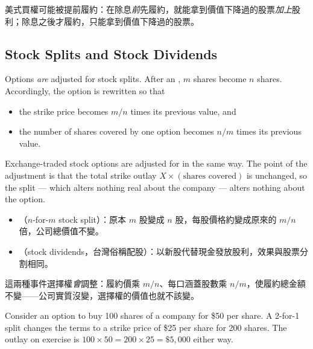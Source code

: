 \suppstart
\begin{remark}
	美式買權可能被提前履約：在除息\emph{前}先履約，就能拿到價值下降過的股票\emph{加上}股利；除息之後才履約，只能拿到價值下降過的股票。
\end{remark}
\suppend

\subsection{Stock Splits and Stock Dividends}


Options \emph{are} adjusted for stock splits.
After an , $m$ shares become $n$ shares.
Accordingly, the option is rewritten so that

\begin{itemize}[nosep]
	\item the strike price becomes $m/n$ times its previous value, and
	\item the number of shares covered by one option becomes $n/m$ times its previous value.
\end{itemize}

\noindent Exchange-traded stock options are adjusted for  in the same way.
\suppstart
The point of the adjustment is that the total strike outlay $X\times(\text{shares covered})$ is unchanged, so the split --- which alters nothing real about the company --- alters nothing about the option.

\begin{remark}
	\begin{itemize}[nosep]
		\item {}（$n$-for-$m$ stock split）：原本 $m$ 股變成 $n$ 股，每股價格約變成原來的 $m/n$ 倍，公司總價值不變。
		\item {}（stock dividends，台灣俗稱配股）：以新股代替現金發放股利，效果與股票分割相同。
	\end{itemize}
	這兩種事件選擇權\emph{會}調整：履約價乘 $m/n$、每口涵蓋股數乘 $n/m$，使履約總金額不變——公司實質沒變，選擇權的價值也就不該變。
\end{remark}
\suppend

\begin{eg}
	Consider an option to buy 100 shares of a company for \$50 per share.
	A 2-for-1 split changes the terms to a strike price of \$25 per share for 200 shares.
\suppstart
	The outlay on exercise is $100\times 50 = 200\times 25 = \$5{,}000$ either way.
\suppend
\end{eg}

